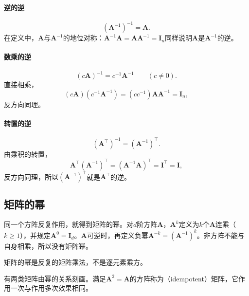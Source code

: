 \paragraph{逆的逆}
\[
 (\bm A^{-1})^{-1}=\bm A.
\]
在定义中，$\bm A$与$\bm A^{-1}$的地位对称：$\bm A^{-1}\bm A=\bm A\bm A^{-1}=\bm I_n$同样说明$\bm A$是$\bm A^{-1}$的逆。

\paragraph{数乘的逆}
\[
 (c\bm A)^{-1}=c^{-1}\bm A^{-1}\qquad(c\neq0).
\]
直接相乘，
\[
 (c\bm A)(c^{-1}\bm A^{-1})=(cc^{-1})\bm A\bm A^{-1}=\bm I_n,
\]
反方向同理。

\paragraph{转置的逆}
\[
 (\bm A^\top)^{-1}=(\bm A^{-1})^\top.
\]
由乘积的转置，
\[
 \bm A^\top(\bm A^{-1})^\top=(\bm A^{-1}\bm A)^\top=\bm I^\top=\bm I,
\]
反方向同理，所以$(\bm A^{-1})^\top$就是$\bm A^\top$的逆。

\subsection{矩阵的幂}
\label{sec:ls-matrix-power-rules}

同一个方阵反复作用，就得到矩阵的幂。对$d$阶方阵$\bm A$，$\bm A^k$定义为$k$个$\bm A$连乘（$k\geq1$），并规定$\bm A^0=\bm I_d$。$\bm A$可逆时，再定义负幂$\bm A^{-k}=(\bm A^{-1})^k$。非方阵不能与自身相乘，所以没有矩阵幂。

矩阵的幂是反复的矩阵乘法，不是逐元素乘方。

有两类矩阵由幂的关系刻画。满足$\bm A^2=\bm A$的方阵称为（idempotent）矩阵，它作用一次与作用多次效果相同。

